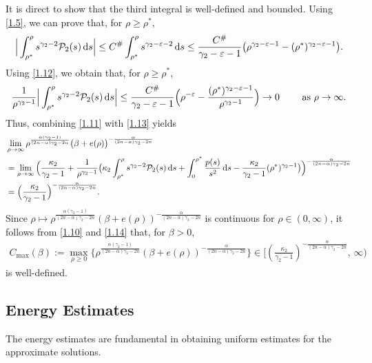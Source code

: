 \documentclass[reqno,11pt]{amsart}
\numberwithin{equation}{section}
\theoremstyle{definition}
\def\dd{{\, \rm d}}
\begin{document}
It is direct to show that the third integral is well-defined and bounded. 
Using \eqref{1.5}, we can prove that, for $\rho \geq \rho^*$,
\begin{align}\label{1.12}
\Big| \int^\rho_{\rho^*} s^{\gamma_2 - 2} \mathcal{P}_2(s) \dd s \Big| 
\leq C^\# \int^\rho_{\rho^*} s^{\gamma_2 - \varepsilon - 2}  \dd s 
\leq \frac{C^\#}{\gamma_2 - \varepsilon - 1}
\big( \rho^{\gamma_2 - \varepsilon - 1} - (\rho^*)^{\gamma_2 - \varepsilon - 1}\big).
\end{align}
Using \eqref{1.12}, we obtain that, for $\rho \geq \rho^*$,
    \begin{align}\label{1.13}
 \frac{1}{\rho^{\gamma_2 - 1}} \Big| \int^\rho_{\rho^*} s^{\gamma_2 - 2} \mathcal{P}_2(s) \dd s \Big| 
       \leq \frac{C^\#}{\gamma_2 - \varepsilon - 1} 
       \Big( \rho^{- \varepsilon} - \frac{(\rho^*)^{\gamma_2 - \varepsilon - 1}}{\rho^{\gamma_2 -1}} \Big) 
       \rightarrow 0\qquad \text{ as $\rho \to \infty$}.
    \end{align}
Thus, combining \eqref{1.11} with \eqref{1.13} yields
\begin{align}\label{1.14}
& \lim_{\rho \to \infty} \rho^{\frac{\alpha(\gamma_2-1)}{(2n-\alpha)\gamma_2 - 2n}}
  \big(\beta + e(\rho)\big)^{-\frac{\alpha}{(2n-\alpha)\gamma_2 - 2n}}\nonumber \\
& = \lim_{\rho \to \infty} \Big( \frac{\kappa_2}{\gamma_2 - 1} + \frac{1}{\rho^{\gamma_2 - 1}} 
\big( \kappa_2 \int^\rho_{\rho^*} s^{\gamma_2 - 2} \mathcal{P}_2(s) \dd s + \int^{\rho^*}_0 \frac{p(s)}{s^2} \dd s - \frac{\kappa_2}{\gamma_2 - 1} (\rho^*)^{\gamma_2 - 1} \big) \Big)^{-\frac{\alpha}{(2n-\alpha)\gamma_2 - 2n}} \nonumber\\
& = \Big( \frac{\kappa_2}{\gamma_2 - 1} \Big)^{-\frac{\alpha}{(2n-\alpha)\gamma_2 - 2n}}.
\end{align}
Since $\rho \mapsto \rho^{\frac{\alpha(\gamma_2-1)}{(2n-\alpha)\gamma_2 - 2n}}
(\beta + e(\rho))^{-\frac{\alpha}{(2n-\alpha)\gamma_2 - 2n}}$ is continuous 
for $\rho \in (0,\infty)$, 
it follows from \eqref{1.10} and \eqref{1.14} that, for $\beta > 0$,
    \begin{align*}
 C_{\text{max}}(\beta) := \max_{\rho \geq 0} 
 \big\{ \rho^{\frac{\alpha(\gamma_2-1)}{(2n-\alpha)\gamma_2 - 2n}}(\beta + e(\rho))^{-\frac{\alpha}{(2n-\alpha)\gamma_2 - 2n}} \big\} \in [ ( \frac{\kappa_2}{\gamma_2 - 1})^{-\frac{\alpha}{(2n-\alpha)\gamma_2 - 2n}}, \,\infty )
    \end{align*}
    is well-defined.

\subsection{Energy Estimates}
The energy estimates are fundamental in obtaining uniform estimates for the approximate solutions.
\end{document}
